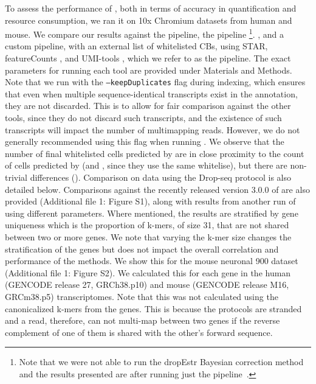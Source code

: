 To assess the performance of \alevin, both in terms of accuracy in quantification and resource consumption, we ran it on 10x Chromium datasets from human and mouse. We compare our results against the \cellr pipeline\citep{tenx}, the \dropest pipeline\citep{dropest} \footnote{Note that we were not able to run the dropEstr Bayesian correction method and the results presented are after running just the \dropest pipeline~\citep{dropseqsrc}.}. , and a custom pipeline, with an external list of whitelisted CBs, using STAR\citep{star}, featureCounts \citep{featurecounts}, and UMI-tools \citep{umitools}, which we refer to as the \naive pipeline. The exact parameters for running each tool are provided under Materials and Methods. Note that we run \alevin with the \texttt{{--}keepDuplicates} flag during indexing, which ensures that even when multiple sequence-identical transcripts exist in the annotation, they are not discarded. This is to allow for fair comparison against the other tools, since they do not discard such transcripts, and the existence of such transcripts will impact the number of multimapping reads. However, we do not generally recommended using this flag when running \alevin. We observe that the number of final whitelisted cells predicted by \alevin are in close proximity to the count of cells predicted by \cellr (and \dropest, since they use the same whitelise), but there are non-trivial differences (). Comparison on data using the Drop-seq\citep{dropseq} protocol is also detailed below. Comparisons against the recently released version 3.0.0 of \cellr are also provided (Additional file 1: Figure S1), along with results from another run of \alevin using different parameters. Where mentioned, the results are stratified by gene uniqueness which is the proportion of k-mers, of size 31, that are not shared between two or more genes. We note that varying the k-mer size changes the stratification of the genes but does not impact the overall correlation and performance of the methods. We show this for the mouse neuronal 900 dataset (Additional file 1: Figure S2). We calculated this for each gene in the human (GENCODE release 27, GRCh38.p10) and mouse (GENCODE release M16, GRCm38.p5) transcriptomes. Note that this was not calculated using the canonicalized k-mers from the genes. This is because the \scrnaseq protocols are stranded and a read, therefore, can not multi-map between two genes if the reverse complement of one of them is shared with the other's forward sequence. 

